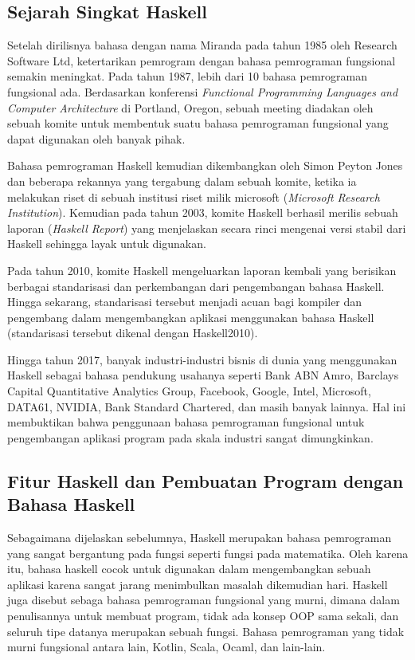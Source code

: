 \documentclass[pi.tex]{subfile}
\begin{document}
\subsection{Sejarah Singkat Haskell}
Setelah dirilisnya bahasa dengan nama Miranda pada tahun 1985 oleh Research Software Ltd, ketertarikan pemrogram dengan bahasa pemrograman fungsional semakin meningkat. Pada tahun 1987, lebih dari 10 bahasa pemrograman fungsional ada. Berdasarkan konferensi \emph{Functional Programming Languages and Computer Architecture} di Portland, Oregon, sebuah meeting diadakan oleh sebuah komite untuk membentuk suatu bahasa pemrograman fungsional yang dapat digunakan oleh banyak pihak.

Bahasa pemrograman Haskell kemudian dikembangkan oleh Simon Peyton Jones dan beberapa rekannya yang tergabung dalam sebuah komite, ketika ia melakukan riset di sebuah institusi riset milik microsoft (\emph{Microsoft Research Institution}). Kemudian pada tahun 2003, komite Haskell berhasil merilis sebuah laporan (\emph{Haskell Report}) yang menjelaskan secara rinci mengenai versi stabil dari Haskell sehingga layak untuk digunakan.

Pada tahun 2010, komite Haskell mengeluarkan laporan kembali yang berisikan berbagai standarisasi dan perkembangan dari pengembangan bahasa Haskell. Hingga sekarang, standarisasi tersebut menjadi acuan bagi kompiler dan pengembang dalam mengembangkan aplikasi menggunakan bahasa Haskell (standarisasi tersebut dikenal dengan Haskell2010).

Hingga tahun 2017, banyak industri-industri bisnis di dunia yang menggunakan Haskell sebagai bahasa pendukung usahanya seperti Bank ABN Amro, Barclays Capital Quantitative Analytics Group, Facebook, Google, Intel, Microsoft, DATA61, NVIDIA, Bank Standard Chartered, dan masih banyak lainnya. Hal ini membuktikan bahwa penggunaan bahasa pemrograman fungsional untuk pengembangan aplikasi program pada skala industri sangat dimungkinkan.


\subsection{Fitur Haskell dan Pembuatan Program dengan Bahasa Haskell}

Sebagaimana dijelaskan sebelumnya, Haskell merupakan bahasa pemrograman yang sangat bergantung pada fungsi seperti fungsi pada matematika. Oleh karena itu, bahasa haskell cocok untuk digunakan dalam mengembangkan sebuah aplikasi karena sangat jarang menimbulkan masalah dikemudian hari. Haskell juga disebut sebaga bahasa pemrograman fungsional yang murni, dimana dalam penulisannya untuk membuat program, tidak ada konsep OOP sama sekali, dan seluruh tipe datanya merupakan sebuah fungsi. Bahasa pemrograman yang tidak murni fungsional antara lain, Kotlin, Scala, Ocaml, dan lain-lain.
\end{document}
